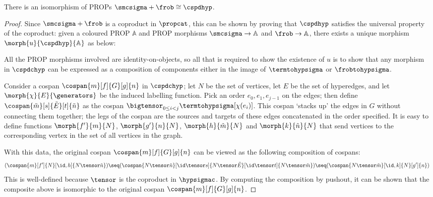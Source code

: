 \begin{theorem}\label{thm:isomorphism-smcfrob-cospans}
    There is an isomorphism of PROPs \(\smcsigma + \frob \cong \cspdhyp\).
\end{theorem}
\begin{proof}
    Since \(\smcsigma + \frob\) is a coproduct in \(\propcat\), this can be
    shown by proving that \(\cspdhyp\) satisfies the universal property of the
    coproduct: given a coloured PROP \(\mathbb{A}\) and PROP morphisms
    \(\smcsigma \to \mathbb{A}\) and \(\frob \to \mathbb{A}\), there exists
    a unique morphism \(\morph{u}{\cspdhyp}{\mathbb{A}}\) as below:

    \begin{center}
        
    \end{center}
    All the PROP morphisms involved are identity-on-objects, so all that is
    required to show the existence of \(u\) is to show that any morphism in
    \(\cspdchyp\) can be expressed as a composition of components either in the
    image of \(\termtohypsigma\) or \(\frobtohypsigma\).

    Consider a cospan \(\cospan{m}[f]{G}[g]{n}\) in \(\cspdchyp\); let \(N\) be
    the set of vertices, let \(E\) be the set of hyperedges, and let
    \(\morph{\chi}{E}{\generators}\) be the induced labelling function.
    Pick an order \(e_0, e_1, e_{j-1}\) on the edges; then define \(
    \cospan{\tilde{m}}[s]{\tilde{E}}[t]{\tilde{n}}
    \) as the cospan \(
    \bigtensor_{0 \leq i < j}
    \termtohypsigma[\chi(e_i)]
    \).
    This cospan `stacks up' the edges in \(G\) without connecting them together;
    the legs of the cospan are the sources and targets of these
    edges concatenated in the order specified.
    It is easy to define functions \(\morph{f^\prime}{m}{N}\),
    \(\morph{g^\prime}{n}{N}\), \(\morph{h}{\tilde{m}}{N}\) and
    \(\morph{k}{\tilde{n}}{N}\) that send vertices to the corresponding vertex in the
    set of all vertices in the graph.

    With this data, the original cospan \(\cospan{m}[f]{G}[g]{n}\) can be
    viewed as the following composition of cospans: \[
        (
        \cospan{m}[f^\prime]{N}[\id,h]{N \tensor \tilde{n}}
        ) \seq (
        \cospan{
            N \tensor \tilde{n}
        }[
            \id \tensor s
        ]{
            N \tensor \tilde{E}
        }[
            \id \tensor t
        ]{
            N \tensor \tilde{m}
        }
        ) \seq (
        \cospan{N \tensor \tilde{m}}[\id, k]{N}[g^\prime]{n}
        )
    \]
    This is well-defined because \(\tensor\) is the coproduct in \(\hypsigmac\).
    By computing the composition by pushout, it can be shown that the composite
    above is isomorphic to the original cospan \(\cospan{m}[f]{G}[g]{n}\).


\end{proof}
